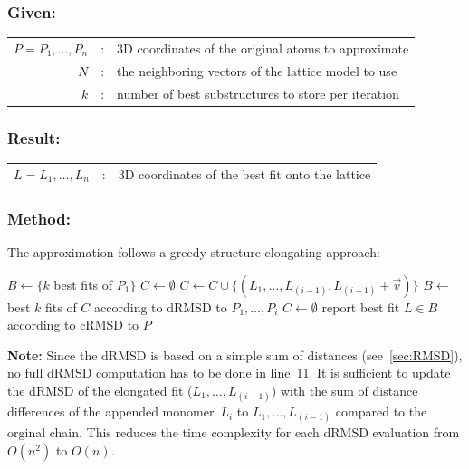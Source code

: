 \documentclass{article}
\begin{document}
\subsubsection*{Given:}

\begin{tabular}{rcl}
	$P=P_1,\ldots,P_n$ &:& 3D coordinates of the original atoms to approximate \\
	$N$ &:& the neighboring vectors of the lattice model to use \\
	$k$ &:& number of best substructures to store per iteration
\end{tabular}

\subsubsection*{Result:}

\begin{tabular}{rcl}
	$L=L_1,\ldots,L_n$ &:& 3D coordinates of the best fit onto the lattice
\end{tabular}

\subsubsection*{Method:}

The approximation follows a greedy structure-elongating approach:

\vspace{0.5em}
\begin{algorithmic}[1]
	\State $B \gets \{k$ best fits of $P_1\}$  \Statex {}
	\State $C \gets \emptyset$ 
		 
					\State $C \gets C \cup \{(L_1,\ldots,L_{(i-1)},L_{(i-1)} + \vec v)\}$
				\EndIf
			\EndFor
		\EndFor
		\State $B \gets $ best $k$ fits of $C$ according to dRMSD to
		$P_1,\ldots,P_{i}$ 
		\State $C \gets \emptyset$ 
	\EndFor
	\State report best fit $L \in B$ according to cRMSD to $P$
\end{algorithmic}

\vspace{1em}
{\bfseries Note:} Since the dRMSD is based on a simple sum of distances
(see~\ref{sec:RMSD}), no full dRMSD computation has to be done in line~11. It is
sufficient to update the dRMSD of the elongated fit ($L_1,\ldots,L_{(i-1)}$) with
the sum of distance differences of the appended monomer~$L_i$ to
$L_1,\ldots,L_{(i-1)}$ compared to the orginal chain. This reduces the time
complexity for each dRMSD evaluation from $O(n^2)$ to $O(n)$.
\end{document}
